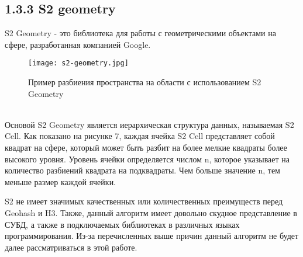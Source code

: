 \subsection{1.3.3 S2 geometry}

S2 Geometry - это библиотека для работы с геометрическими объектами на сфере, разработанная компанией Google. 
  \\
\begin{figure}[h]
    \centering
    \texttt{[image: s2-geometry.jpg]}
    \caption{Пример разбиения пространства на области с использованием S2 Geometry}
\end{figure}
  \\
Основой S2 Geometry является иерархическая структура данных, называемая S2 Cell. Как показано на рисунке 7, каждая ячейка S2 Cell представляет собой квадрат на сфере, который может быть разбит на более мелкие квадраты более высокого уровня. Уровень ячейки определяется числом n, которое указывает на количество разбиений квадрата на подквадраты. Чем больше значение n, тем меньше размер каждой ячейки.


S2 не имеет значимых качественных или количественных преимуществ перед Geohash и H3. Также, данный алгоритм имеет довольно скудное представление в СУБД, а также в подключаемых библиотеках в различных языках программирования. 
Из-за перечисленных выше причин данный алгоритм не будет далее рассматриваться в этой работе. 
